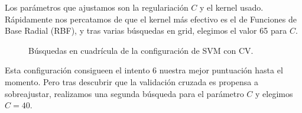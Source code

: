 \documentclass{article}
\begin{document}
Los parámetros que ajustamos son la regulariación $C$ y el kernel
usado. Rápidamente nos percatamos de que el kernel más efectivo es el
de Funciones de Base Radial (RBF), y tras varias búsquedas en grid,
elegimos el valor 65 para $C$.

\begin{figure}[H]
  \centering
  \caption{Búsquedas en cuadrícula de la configuración de SVM con CV.}
  \label{fig:tune-svm}
\end{figure}

Esta configuración consigueen el intento 6 nuestra mejor puntuación
hasta el momento. Pero tras descubrir que la validación cruzada es
propensa a sobreajustar, realizamos una segunda búsqueda para el
parámetro $C$ y elegimos $C=40$.
\end{document}
